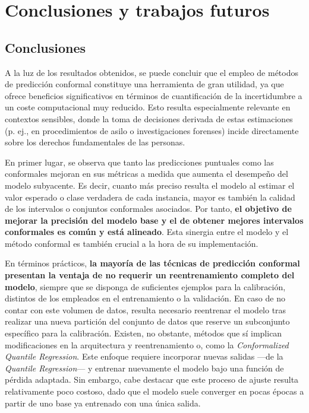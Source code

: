 \chapter{Conclusiones y trabajos futuros}

\section{Conclusiones}

A la luz de los resultados obtenidos, se puede concluir que el empleo de métodos de predicción conformal constituye una herramienta de gran utilidad, ya que ofrece beneficios significativos en términos de cuantificación de la incertidumbre a un coste computacional muy reducido. Esto resulta especialmente relevante en contextos sensibles, donde la toma de decisiones derivada de estas estimaciones (p. ej., en procedimientos de asilo o investigaciones forenses) incide directamente sobre los derechos fundamentales de las personas.


En primer lugar, se observa que tanto las predicciones puntuales como las conformales mejoran en sus métricas a medida que aumenta el desempeño del modelo subyacente. Es decir, cuanto más preciso resulta el modelo al estimar el valor esperado o clase verdadera de cada instancia, mayor es también la calidad de los intervalos o conjuntos conformales asociados. Por tanto, \textbf{el objetivo de mejorar la precisión del modelo base y el de obtener mejores intervalos conformales es común y está alineado}. Esta sinergia entre el modelo y el método conformal es también crucial a la hora de su implementación.

En términos prácticos, \textbf{la mayoría de las técnicas de predicción conformal presentan la ventaja de no requerir un reentrenamiento completo del modelo}, siempre que se disponga de suficientes ejemplos para la calibración, distintos de los empleados en el entrenamiento o la validación. En caso de no contar con este volumen de datos, resulta necesario reentrenar el modelo tras realizar una nueva partición del conjunto de datos que reserve un subconjunto específico para la calibración.
Existen, no obstante, métodos que sí implican modificaciones en la arquitectura y reentrenamiento o, como la \textit{Conformalized Quantile Regression}. Este enfoque requiere incorporar nuevas salidas ---de la \textit{Quantile Regression}--- y entrenar nuevamente el modelo bajo una función de pérdida adaptada. Sin embargo, cabe destacar que este proceso de ajuste resulta relativamente poco costoso, dado que el modelo suele converger en pocas épocas a partir de uno base ya entrenado con una única salida.


